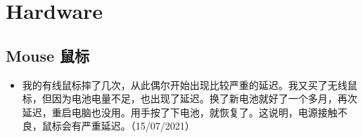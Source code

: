 \chapter{Hardware}

\section{Mouse 鼠标}

\begin{itemize}
\item 我的有线鼠标摔了几次，从此偶尔开始出现比较严重的延迟。我又买了无线鼠标，但因为电池电量不足，也出现了延迟。换了新电池就好了一个多月，再次延迟，重启电脑也没用。用手按了下电池，就恢复了。这说明，电源接触不良，鼠标会有严重延迟。（15/07/2021）
\end{itemize}
